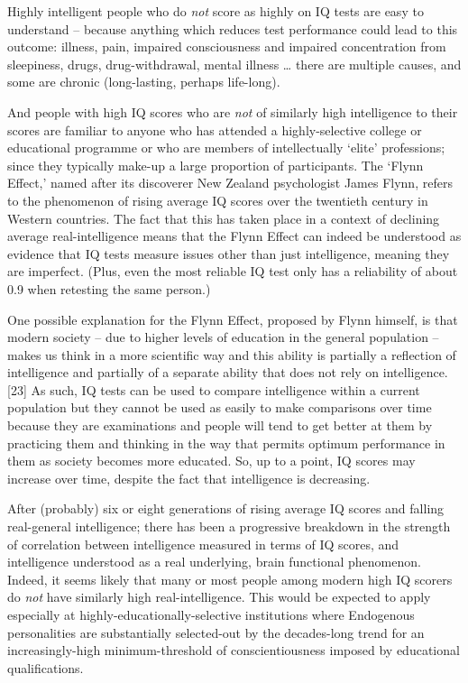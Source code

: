 \documentclass[
]{book}
\begin{document}
Highly intelligent people who do \emph{not} score as highly on IQ tests are easy to understand -- because anything which reduces test performance could lead to this outcome: illness, pain, impaired consciousness and impaired concentration from sleepiness, drugs, drug-withdrawal, mental illness \ldots{} there are multiple causes, and some are chronic (long-lasting, perhaps life-long).

And people with high IQ scores who are \emph{not} of similarly high intelligence to their scores are familiar to anyone who has attended a highly-selective college or educational programme or who are members of intellectually `elite' professions; since they typically make-up a large proportion of participants. The `Flynn Effect,' named after its discoverer New Zealand psychologist James Flynn, refers to the phenomenon of rising average IQ scores over the twentieth century in Western countries. The fact that this has taken place in a context of declining average real-intelligence means that the Flynn Effect can indeed be understood as evidence that IQ tests measure issues other than just intelligence, meaning they are imperfect. (Plus, even the most reliable IQ test only has a reliability of about 0.9 when retesting the same person.)

One possible explanation for the Flynn Effect, proposed by Flynn himself, is that modern society -- due to higher levels of education in the general population -- makes us think in a more scientific way and this ability is partially a reflection of intelligence and partially of a separate ability that does not rely on intelligence.{[}23{]} As such, IQ tests can be used to compare intelligence within a current population but they cannot be used as easily to make comparisons over time because they are examinations and people will tend to get better at them by practicing them and thinking in the way that permits optimum performance in them as society becomes more educated. So, up to a point, IQ scores may increase over time, despite the fact that intelligence is decreasing.

After (probably) six or eight generations of rising average IQ scores and falling real-general intelligence; there has been a progressive breakdown in the strength of correlation between intelligence measured in terms of IQ scores, and intelligence understood as a real underlying, brain functional phenomenon. Indeed, it seems likely that many or most people among modern high IQ scorers do \emph{not} have similarly high real-intelligence. This would be expected to apply especially at highly-educationally-selective institutions where Endogenous personalities are substantially selected-out by the decades-long trend for an increasingly-high minimum-threshold of conscientiousness imposed by educational qualifications.
\end{document}
